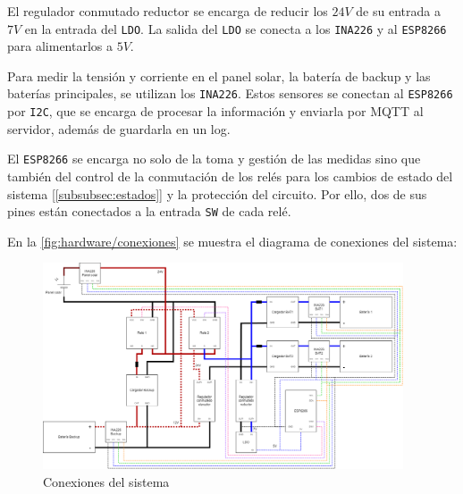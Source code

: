 El regulador conmutado reductor se encarga de reducir los $24 V$ de su entrada a $7 V$ en la entrada del \texttt{LDO}. La salida del \texttt{LDO} se conecta a los \texttt{INA226} y al \texttt{ESP8266} para alimentarlos a $5 V$.

Para medir la tensión y corriente en el panel solar, la batería de backup y las baterías principales, se utilizan los \texttt{INA226}. Estos sensores se conectan al \texttt{ESP8266} por \texttt{I2C}, que se encarga de procesar la información y enviarla por MQTT al servidor, además de guardarla en un log.

El \texttt{ESP8266} se encarga no solo de la toma y gestión de las medidas sino que también del control de la conmutación de los relés para los cambios de estado del sistema [\autoref{subsubsec:estados}] y la protección del circuito. Por ello, dos de sus pines están conectados a la entrada \texttt{SW} de cada relé.

En la \autoref{fig:hardware/conexiones} se muestra el diagrama de conexiones del sistema:

\begin{figure}[H]
    \centering
    \includegraphics[width=0.95\textwidth]{images/2-hardware/Conexiones.png}
    \caption{Conexiones del sistema}
    \label{fig:hardware/conexiones}
\end{figure}
